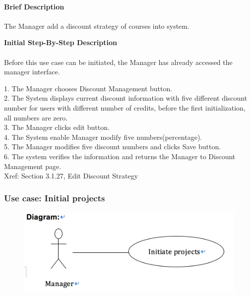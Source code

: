 \documentclass[12pt]{report}
\begin{document}
\paragraph{}
\begin{flushleft}
\textbf{Brief Description }
\paragraph{}
The Manager add a discount strategy of courses into system. \\

\begin{flushleft}
\textbf{Initial Step-By-Step Description }
\paragraph{}
Before this use case can be initiated, the Manager has already accessed the manager interface.

\begin{flushleft}
1.	The Manager chooses Discount Management button. \\
2.	The System displays current discount information with five different discount number for users with different number of credits, before the first initialization, all numbers are zero. \\
3.	The Manager clicks edit button. \\
4.	The System enable Manager modify five numbers(percentage). \\
5.	The Manager modifies five discount numbers and clicks Save button. \\
6.	The system verifies the information and returns the Manager to Discount Management page. \\
Xref: Section 3.1.27, Edit Discount Strategy
\end{flushleft}
\end{flushleft}
\end{flushleft}

\newpage
\subsubsection{Use case:  Initial projects }

\begin{figure}[!htb]
  \includegraphics{214.PNG}
\end{figure}
\end{document}
